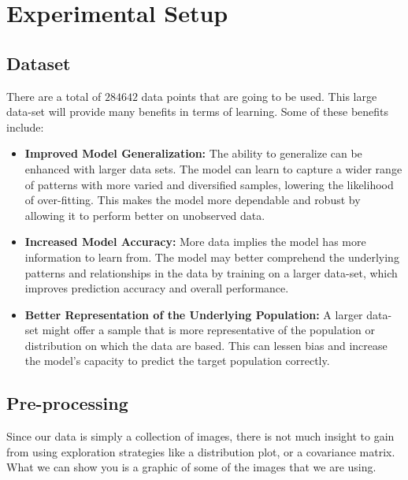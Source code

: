 \documentclass[a4paper,twoside,10pt]{article}
\begin{document}
\section{Experimental Setup}
\label{sec:experimental_setup}

\subsection{Dataset}
There are a total of $284642$ data points that are going to be used. This large data-set will provide many benefits in terms of learning. Some of these benefits include:
\begin{itemize}
    \item \textbf{Improved Model Generalization:} The ability to generalize can be enhanced with larger data sets. The model can learn to capture a wider range of patterns with more varied and diversified samples, lowering the likelihood of over-fitting. This makes the model more dependable and robust by allowing it to perform better on unobserved data.

    \item \textbf{Increased Model Accuracy:} More data implies the model has more information to learn from. The model may better comprehend the underlying patterns and relationships in the data by training on a larger data-set, which improves prediction accuracy and overall performance.

    \item \textbf{Better Representation of the Underlying Population:} A larger data-set might offer a sample that is more representative of the population or distribution on which the data are based. This can lessen bias and increase the model's capacity to predict the target population correctly.
\end{itemize}

\subsection{Pre-processing}
Since our data is simply a collection of images, there is not much insight to gain from using exploration strategies like a distribution plot, or a covariance matrix. What we can show you is a graphic of some of the images that we are using.
\end{document}

